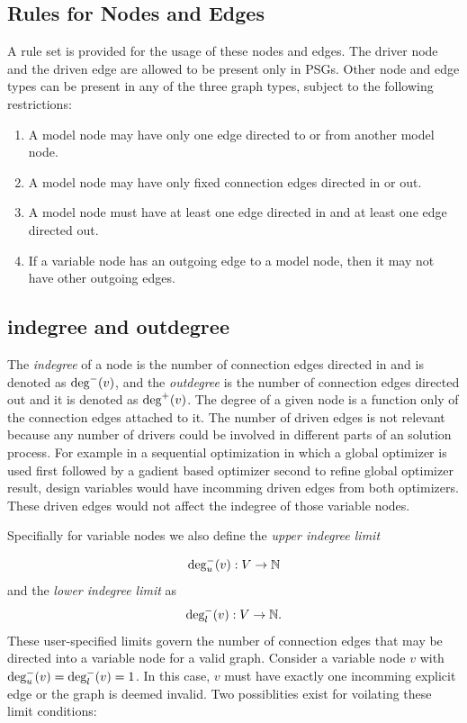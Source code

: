 \subsection{Rules for Nodes and Edges}
  \label{ss:rules}
  A rule set is provided for the usage of these nodes and edges.
  The driver node and the driven edge are allowed to be present only in PSGs.
  Other node and edge types can be present in any of the three graph types, subject to the following restrictions: 
  \begin{enumerate}
  \item A model node may have only one edge directed to or from another model node.
  \item A model node may have only fixed connection edges directed in or out.
  \item A model node must have at least one edge directed in and at least one edge 
    directed out.
  \item If a variable node has an outgoing edge to a model node, then it may not have other outgoing edges.
  \end{enumerate}

\subsection{indegree and outdegree}
  \label{s:indegree-outdegree}
  The \emph{indegree} of a node is the number of connection edges directed in and 
  is denoted as $\textrm{deg}^-(v)$, and the \emph{outdegree} 
  is the number of connection edges directed out and it is denoted as $\textrm{deg}^+(v)$.
  The degree of a given node is a function only of the connection edges 
  attached to it. The number of driven edges is not relevant because any number 
  of drivers could be involved in different parts of an solution process. For 
  example in a sequential optimization in which a global optimizer is used first 
  followed by a gadient based optimizer second to refine global optimizer 
  result, design variables would have incomming driven edges from both optimizers. 
  These driven edges would not affect the indegree of those variable nodes. 

  Specifially for variable nodes we also define the \emph{upper indegree limit} 

  \begin{equation}
  \textrm{deg}_u^-(v):V \to \mathbb{N}
  \end{equation} 
  and the \emph{lower indegree limit} as
  \begin{equation}
  \textrm{deg}_l^-(v):V \to \mathbb{N}.
  \end{equation}
  These user-specified limits govern the number of connection edges that may 
  be directed into a variable node for a valid graph. Consider a variable 
  node $v$ with $\textrm{deg}_u^-(v) = \textrm{deg}_l^-(v) = 1$. In this case, $v$ 
  must have exactly one incomming explicit edge or the graph is deemed invalid. 
  Two possiblities exist for voilating these limit conditions: 

